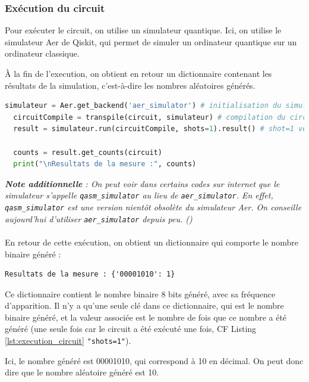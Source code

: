 \documentclass{article}
\begin{document}
\subsubsection{Exécution du circuit}

Pour exécuter le circuit, on utilise un simulateur quantique. Ici, on utilise le simulateur Aer de Qiskit, qui permet de simuler un ordinateur quantique sur un ordinateur classique.

À la fin de l'execution, on obtient en retour un dictionnaire contenant les résultats de la simulation, c'est-à-dire les nombres aléatoires générés.

\begin{lstlisting}[language=Python, style=mystyle, caption={Exécution du circuit}, label={lst:execution_circuit}]
  simulateur = Aer.get_backend('aer_simulator') # initialisation du simulateur Aer avec le backend aer_simulator
  circuitCompile = transpile(circuit, simulateur) # compilation du circuit pour le simulateur
  result = simulateur.run(circuitCompile, shots=1).result() # shot=1 veut dire qu'on execute le circuit une seule fois
  
  counts = result.get_counts(circuit)
  print("\nResultats de la mesure :", counts)  
\end{lstlisting}

\textit{\textbf{Note additionnelle} : On peut voir dans certains codes sur internet que le simulateur s'appelle \texttt{qasm\_simulator} au lieu de \texttt{aer\_simulator}. En effet, \texttt{qasm\_simulator} est une version nientôt obsolète du simulateur Aer. On conseille aujourd'hui d'utiliser \texttt{aer\_simulator} depuis peu. (\cite{stackexchangeWhatDifferences})}
\\ \\
En retour de cette exécution, on obtient un dictionnaire qui comporte le nombre binaire généré :
\begin{lstlisting}[style=mystyle, caption={Résultat de la mesure : \{'00001010': 1\}}]
  Resultats de la mesure : {'00001010': 1}
\end{lstlisting}
Ce dictionnaire contient le nombre binaire 8 bits généré, avec sa fréquence d'apparition. Il n'y a qu'une seule clé dans ce dictionnaire, qui est le nombre binaire généré, et la valeur associée est le nombre de fois que ce nombre a été généré (une seule fois car le circuit a été exécuté une fois, CF Listing \ref{lst:execution_circuit} \texttt{"shots=1"}).

Ici, le nombre généré est 00001010, qui correspond à 10 en décimal. On peut donc dire que le nombre aléatoire généré est 10.
\end{document}
